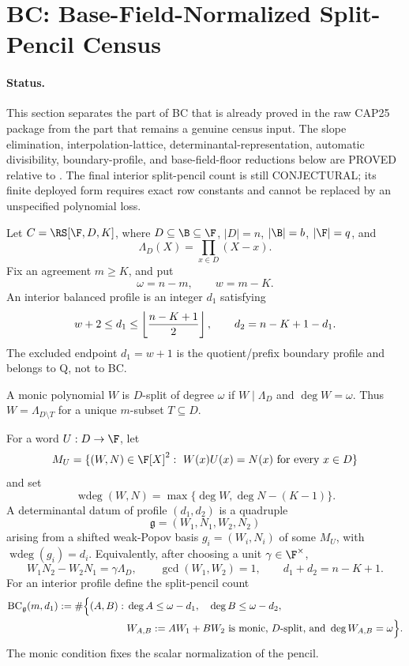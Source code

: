 \section{BC: Base-Field-Normalized Split-Pencil Census}
\label{sec:gf-work-bc}

\paragraph{Status.}
This section separates the part of BC that is already proved in the raw
CAP25 package from the part that remains a genuine census input.  The slope
elimination, interpolation-lattice, determinantal-representation, automatic
divisibility, boundary-profile, and base-field-floor reductions below are
PROVED relative to \cite{CAP25v13}.  The final interior split-pencil count is
still CONJECTURAL; its finite deployed form requires exact row constants and
cannot be replaced by an unspecified polynomial loss.

\begin{definition}
\label{def:gf-bc-parameters}
Let \(C=\RS[\F,D,K]\), where \(D\subseteq\B\subseteq\F\), \(|D|=n\),
\(|\B|=b\), \(|\F|=q\), and
\[
        \Lambda_D(X)=\prod_{x\in D}(X-x).
\]
Fix an agreement \(m\ge K\), and put
\[
        \omega=n-m,\qquad w=m-K .
\]
An interior balanced profile is an integer \(d_1\) satisfying
\[
        w+2\le d_1\le \left\lfloor {n-K+1\over2}\right\rfloor,
        \qquad d_2=n-K+1-d_1 .
\]
The excluded endpoint \(d_1=w+1\) is the quotient/prefix boundary profile and
belongs to Q, not to BC.

A monic polynomial \(W\) is \(D\)-split of degree \(\omega\) if
\(W\mid\Lambda_D\) and \(\deg W=\omega\).  Thus \(W=\Lambda_{D\setminus T}\)
for a unique \(m\)-subset \(T\subseteq D\).
\end{definition}

\begin{definition}
\label{def:gf-bc-pencil-count}
For a word \(U:D\to\F\), let
\[
        M_U=\{(W,N)\in\F[X]^2:\ W(x)U(x)=N(x)\ \text{for every }x\in D\}
\]
and set
\[
        \operatorname{wdeg}(W,N)=
        \max\{\deg W,\deg N-(K-1)\}.
\]
A determinantal datum of profile \((d_1,d_2)\) is a quadruple
\[
        \mathfrak g=(W_1,N_1,W_2,N_2)
\]
arising from a shifted weak-Popov basis \(g_i=(W_i,N_i)\) of some \(M_U\), with
\(\operatorname{wdeg}(g_i)=d_i\).  Equivalently, after choosing a unit
\(\gamma\in\F^\times\),
\[
        W_1N_2-W_2N_1=\gamma\Lambda_D,\qquad \gcd(W_1,W_2)=1,
        \qquad d_1+d_2=n-K+1.
\]
For an interior profile define the split-pencil count
\[
\begin{aligned}
        \mathrm{BC}_{\mathfrak g}(m,d_1)
        :=\#\Bigl\{(A,B):\;&
        \deg A\le \omega-d_1,\quad
        \deg B\le \omega-d_2,\\
        &W_{A,B}:=AW_1+BW_2
        \text{ is monic, }D\text{-split, and }\deg W_{A,B}=\omega
        \Bigr\}.
\end{aligned}
\]
The monic condition fixes the scalar normalization of the pencil.
\end{definition}

